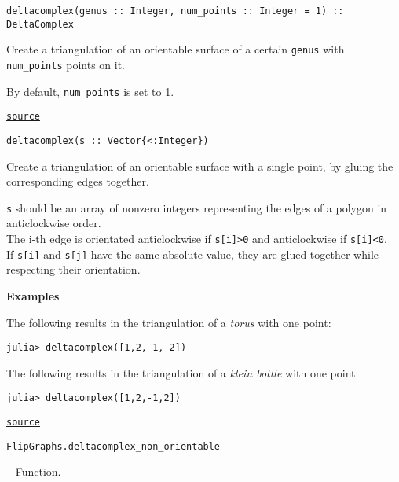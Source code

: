 \begin{adjustwidth}{2em}{0pt}


\begin{verbatim}
deltacomplex(genus :: Integer, num_points :: Integer = 1) :: DeltaComplex
\end{verbatim}

Create a triangulation of an orientable surface of a certain \texttt{genus} with \texttt{num\_points} points on it. 

By default, \texttt{num\_points} is set to 1.



\href{https://github.com/schto223/FlipGraphs.jl/blob/490c01a7adf74b42f27dda05099165c47ae8133e/src/deltaComplex.jl#L590-L596}{\texttt{source}}



\begin{verbatim}
deltacomplex(s :: Vector{<:Integer})
\end{verbatim}

Create a triangulation of an orientable surface with a single point, by gluing the corresponding edges together.

\texttt{s} should be an array of nonzero integers representing the edges of a polygon in anticlockwise order.\\
The i-th edge is orientated anticlockwise if \texttt{s[i]>0} and anticlockwise if \texttt{s[i]<0}.\\
If \texttt{s[i]} and \texttt{s[j]} have the same absolute value, they are glued together while respecting their orientation.

\textbf{Examples}

The following results in the triangulation of a \emph{torus} with one point:


\begin{verbatim}
julia> deltacomplex([1,2,-1,-2])
\end{verbatim}

The following results in the triangulation of a \emph{klein bottle} with one point:


\begin{verbatim}
julia> deltacomplex([1,2,-1,2])
\end{verbatim}



\href{https://github.com/schto223/FlipGraphs.jl/blob/490c01a7adf74b42f27dda05099165c47ae8133e/src/deltaComplex.jl#L646-L665}{\texttt{source}}


\end{adjustwidth}
\hypertarget{14191397339116909052}{\texttt{FlipGraphs.deltacomplex\_non\_orientable}}  -- {Function.}

